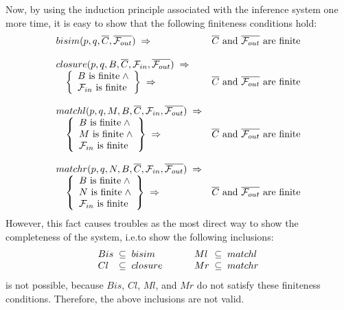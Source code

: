 Now, by using the induction principle associated with the inference system one more time, it is easy to show that the following finiteness conditions hold:
\[
\begin{array}{lll}
\multicolumn{2}{l}{bisim(p,q,\overline{C},\overline{{\cal F}_{out}})\;\Rightarrow}&
\overline{C}\mbox{ and }\overline{{\cal F}_{out}}\mbox{ are finite}\\
\\
\multicolumn{2}{l}{closure(p,q,B,\overline{C},{\cal F}_{in},\overline{{\cal F}_{out}})\;\Rightarrow}\\
&\left\{\begin{array}{l} B\mbox{ is finite}\;\wedge\\ {\cal F}_{in}\mbox{ is finite}\end{array}\right\}\;\Rightarrow &
\overline{C}\mbox{ and }\overline{{\cal F}_{out}}\mbox{ are finite}\\
\\
\multicolumn{2}{l}{matchl(p,q,M,B,\overline{C},{\cal F}_{in},\overline{{\cal F}_{out}})\;\Rightarrow}\\
&\left\{\begin{array}{l} B\mbox{ is finite}\;\wedge\\  M\mbox{ is finite}\;\wedge\\ {\cal F}_{in}\mbox{ is finite}\end{array}\right\}\;\Rightarrow &
\overline{C}\mbox{ and }\overline{{\cal F}_{out}}\mbox{ are finite}\\
\\
\multicolumn{2}{l}{matchr(p,q,N,B,\overline{C},{\cal F}_{in},\overline{{\cal F}_{out}})\;\Rightarrow}\\
&\left\{\begin{array}{l} B\mbox{ is finite}\;\wedge\\  N\mbox{ is finite}\;\wedge\\ {\cal F}_{in}\mbox{ is finite}\end{array}\right\}\;\Rightarrow &
\overline{C}\mbox{ and }\overline{{\cal F}_{out}}\mbox{ are finite}\\
\end{array}
\]
However, this fact causes troubles as the most direct way to show the completeness of the system, i.e.\@ to show the following inclusions:
\[
\begin{array}{l@{\;\;\subseteq\;\;}l@{\;\;\;\;\;\;\;\;\;\;\;\;}l@{\;\;\subseteq\;\;}l}
Bis & bisim    & Ml & matchl\\
Cl  & closure  & Mr & matchr 
\end{array}
\]
is not possible, because $Bis$, $Cl$, $Ml$, and $Mr$ do not satisfy these finiteness conditions. Therefore, the above inclusions are not valid.

